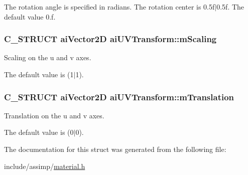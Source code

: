 \-The rotation angle is specified in radians. \-The rotation center is 0.\-5f$|$0.5f. \-The default value 0.\-f. \hypertarget{structaiUVTransform_a89429a027cbf914e7212e48149a957c8}{
\subsubsection[{m\-Scaling}]{\setlength{\rightskip}{0pt plus 5cm}\-C\-\_\-\-S\-T\-R\-U\-C\-T {\bf ai\-Vector2\-D} {\bf ai\-U\-V\-Transform\-::m\-Scaling}}}\label{structaiUVTransform_a89429a027cbf914e7212e48149a957c8}
\-Scaling on the u and v axes.

\-The default value is (1$|$1). \hypertarget{structaiUVTransform_a8c7f35959aa342bf0cef670246fbb813}{
\subsubsection[{m\-Translation}]{\setlength{\rightskip}{0pt plus 5cm}\-C\-\_\-\-S\-T\-R\-U\-C\-T {\bf ai\-Vector2\-D} {\bf ai\-U\-V\-Transform\-::m\-Translation}}}\label{structaiUVTransform_a8c7f35959aa342bf0cef670246fbb813}
\-Translation on the u and v axes.

\-The default value is (0$|$0). 

\-The documentation for this struct was generated from the following file\-:\begin{DoxyCompactItemize}
\item 
include/assimp/\hyperlink{material_8h}{material.\-h}\end{DoxyCompactItemize}
